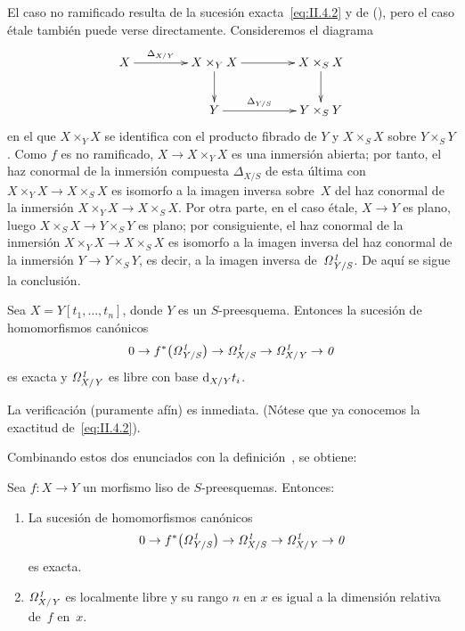 El caso no ramificado resulta de la sucesión exacta~\eqref{eq:II.4.2} y de (), pero el caso étale también puede verse directamente. Consideremos el diagrama
\begin{equation*}
\xymatrix@C=1.5cm{
X \ar[r]^-{\Delta_{X/Y}} & X\times_Y X \ar[d] \ar[r] &
X\times_S X \ar[d] \\ & Y \ar[r]^-{\Delta_{Y/S}} & Y\times_S Y
}
\end{equation*}
en el que $X\times_Y X$ se identifica con el producto fibrado de $Y$ y $X\times_S X$ sobre $Y\times_S Y$. Como $f$ es no ramificado, $X\to X\times_Y X$ es una inmersión abierta; por tanto, el haz conormal de la inmersión compuesta $\Delta_{X/S}$ de esta última con $X\times_Y X\to X\times_S X$ es isomorfo a la imagen inversa sobre~$X$ del haz conormal de la inmersión $X\times_Y X\to X\times_S X$. Por otra parte, en el caso étale, $X\to Y$ es plano, luego $X\times_S X\to Y\times_S Y$ es plano; por consiguiente, el haz conormal de la inmersión $X\times_Y X\to X\times_S X$ es isomorfo a la imagen inversa del haz conormal de la inmersión $Y\to Y\times_S Y$, es decir, a la imagen inversa de~$\it{\Omega}^1_{Y/S}$. De aquí se sigue la conclusión.

\begin{lemme}
\label{II.4.2}
Sea $X=Y[t_1,\dots,t_n]$, donde $Y$ es un $S$-preesquema. Entonces la sucesión de homomorfismos canónicos
\[
0\to f^*\big(\it{\Omega}^1_{Y/S}\big)\to
\it{\Omega}^1_{X/S}\to\it{\Omega}^1_{X/Y}\to 0
\]
es exacta y $\it{\Omega}^1_{X/Y}$ es libre con base $\mathrm{d}_{X/Y}t_i$.
\end{lemme}

La verificación (puramente afín) es inmediata. (Nótese que ya conocemos la exactitud de~\eqref{eq:II.4.2}).

Combinando estos dos enunciados con la definición~, se obtiene:

\begin{theoreme}
\label{II.4.3}
Sea $f\colon X\to Y$ un morfismo liso de $S$-preesquemas. Entonces:
\begin{enumerate}
\item[(i)] La sucesión de homomorfismos canónicos
\[
0\to f^*\big(\it{\Omega}^1_{Y/S}\big)\to
\it{\Omega}^1_{X/S}\to\it{\Omega}^1_{X/Y}\to 0
\]
es exacta.
\item[(ii)] $\it{\Omega}^1_{X/Y}$ es localmente libre y su rango $n$ en $x$ es igual a la dimensión relativa de~$f$ en~$x$.
\end{enumerate}
\end{theoreme}


